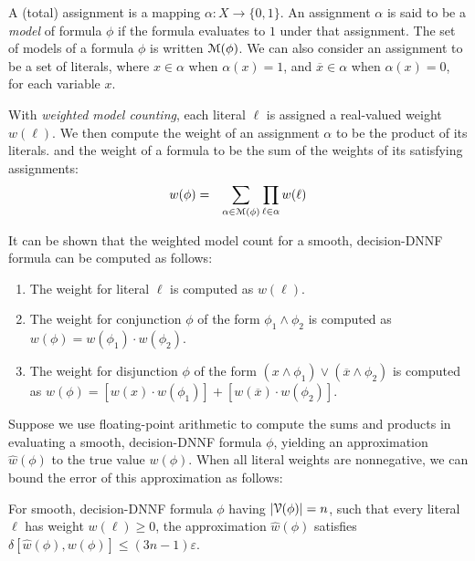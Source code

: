 \documentclass[letterpaper,USenglish,cleveref, autoref, thm-restate]{lipics-v2021}
\newcommand{\obar}[1]{\overline{#1}}
\newcommand{\lit}{\ell}
\newcommand{\approximate}[1]{\hat{#1}}
\newcommand{\approxw}{\approximate{w}}
\newcommand{\aerror}{\delta}
\newcommand{\roundepsilon}{\varepsilon}
\newcommand{\varset}{X}
\newcommand{\dependencyset}{{\cal V}}
\newcommand{\assign}{\alpha}
\newcommand{\modelset}{{\cal M}}
\begin{document}
A (total) assignment is a mapping $\assign \colon \varset \rightarrow \{0, 1\}$.  An assignment $\assign$ is said to be a \emph{model} of formula
$\phi$ if the formula evaluates to $1$ under that assignment.  The
set of models of a formula $\phi$ is written $\modelset(\phi)$.  We
can also consider an assignment to be a set of literals, where
$x \in \assign$ when $\assign(x) = 1$, and  $\obar{x} \in \assign$ when $\assign(x) = 0$, for each variable $x$.

With \emph{weighted model counting}, each literal $\lit$ is assigned a
real-valued weight $w(\lit)$.  We then compute the weight of an
assignment $\assign$ to be the product of its literals. and the weight
of a formula to be the sum of the weights of its satisfying assignments:
\begin{eqnarray}
  w(\phi) & = & \sum_{\assign \in \modelset(\phi)} \prod_{\lit \in \assign} w(\lit) \label{eqn:model:count}
\end{eqnarray}

It can be shown that the weighted model count for a smooth, decision-DNNF formula can be computed as follows:
\begin{enumerate}
\item The weight for literal $\lit$ is computed as $w(\lit)$.
\item The weight for  conjunction $\phi$ of the form $\phi_1 \land \phi_2$ is computed as $w(\phi) = w(\phi_1) \cdot w(\phi_2)$.
\item The weight for disjunction $\phi$ of the form 
  $(x \land \phi_1) \lor (\obar{x} \land \phi_2)$ is computed as
  $w(\phi) = [w(x) \cdot w(\phi_1)] + [w(\obar{x}) \cdot w(\phi_2)]$.
\end{enumerate}

Suppose we use floating-point arithmetic to compute the sums and products in evaluating a smooth, decision-DNNF formula $\phi$, yielding
an approximation $\approxw(\phi)$ to the true value $w(\phi)$.  When all literal weights are nonnegative, we can bound the error of this approximation as follows:
\begin{theorem}
  For smooth, decision-DNNF formula $\phi$ having $|\dependencyset(\phi)| = n$, such that every literal $\lit$ has weight $w(\lit) \geq 0$,
the approximation $\approxw(\phi)$ satisfies
  $\aerror[\approxw(\phi), w(\phi)] \leq (3n-1)\roundepsilon$.
  \label{thm:approx:pos}
\end{theorem}
\end{document}
